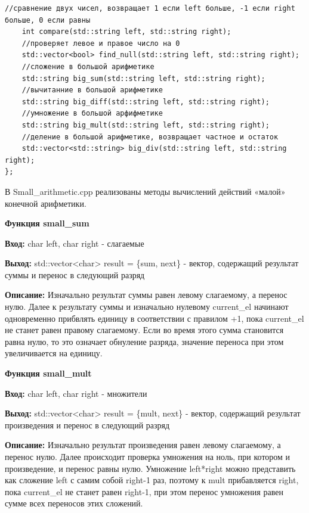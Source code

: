 \begin{lstlisting}[caption=Arithmetic\_class.h, label=lst:Arithmetic-class.h]
    //сравнение двух чисел, возвращает 1 если left больше, -1 если right больше, 0 если равны
    int compare(std::string left, std::string right);
    //проверяет левое и правое число на 0
    std::vector<bool> find_null(std::string left, std::string right);
    //сложение в большой арифметике
    std::string big_sum(std::string left, std::string right);
    //вычитанние в большой арифметике
    std::string big_diff(std::string left, std::string right);
    //умножение в большой арфифметике
    std::string big_mult(std::string left, std::string right);
    //деление в большой арифметике, возвращает частное и остаток
    std::vector<std::string> big_div(std::string left, std::string right);
};
\end{lstlisting}

 \par

В Small\_arithmetic.cpp реализованы методы вычислений действий «малой» конечной арифметики.
\vspace{8pt}

\textbf{Функция small\_sum } \par
\textbf{Вход:} char left, char right - слагаемые \par
\textbf{Выход:} std::vector<char> result = \{sum, next\} - вектор, содержащий результат суммы и перенос в следующий разряд \par
\textbf{Описание:} Изначально результат суммы равен левому слагаемому, а перенос нулю. Далее к результату суммы и изначально нулевому current\_el начинают одновременно прибвлять единицу в соответствии с правилом +1, пока current\_el не станет равен правому слагаемому. Если во время этого сумма становится равна нулю, то это означает обнуление разряда, значение переноса при этом увеличивается на единицу.\par
\vspace{10pt}

\textbf{Функция small\_mult } \par
\textbf{Вход:} char left, char right - множители \par
\textbf{Выход:} std::vector<char> result = \{mult, next\} - вектор, содержащий результат произведения и перенос в следующий разряд \par
\textbf{Описание:} Изначально результат произведения равен левому слагаемому, а перенос нулю. Далее происходит проверка умножения на ноль, при котором и произведение, и перенос равны нулю. Умножение left*right можно представить как сложение left с самим собой right-1 раз, поэтому к mult прибавляется right, пока current\_el не станет равен right-1, при этом перенос умножения равен сумме всех переносов этих сложений.\par
\vspace{10pt}

